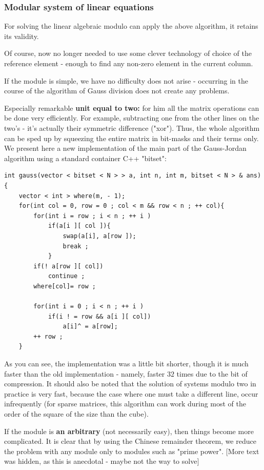 \subsubsection{ Modular system of linear equations }

For solving the linear algebraic modulo can apply the above algorithm, it retains its validity.

Of course, now no longer needed to use some clever technology of choice of the reference element - enough to find any non-zero element in the current column.

If the module is simple, we have no difficulty does not arise - occurring in the course of the algorithm of Gauss division does not create any problems.

Especially remarkable \textbf{unit equal to two:} for him all the matrix operations can be done very efficiently. For example, subtracting one from the other lines on the two's - it's actually their symmetric difference ("xor"). Thus, the whole algorithm can be sped up by squeezing the entire matrix in bit-masks and their terms only. We present here a new implementation of the main part of the Gauss-Jordan algorithm using a standard container C++ "bitset":

\begin{verbatim}
int gauss(vector < bitset < N > > a, int n, int m, bitset < N > & ans){
    vector < int > where(m, - 1);
    for(int col = 0, row = 0 ; col < m && row < n ; ++ col){
        for(int i = row ; i < n ; ++ i )
            if(a[i ][ col ]){
                swap(a[i], a[row ]);
                break ;
            }
        if(! a[row ][ col])
            continue ;
        where[col]= row ;
 
        for(int i = 0 ; i < n ; ++ i )
            if(i ! = row && a[i ][ col])
                a[i]^ = a[row];
        ++ row ;
    } 
\end{verbatim}
As you can see, the implementation was a little bit shorter, though it is much faster than the old implementation - namely, faster $32$ times due to the bit of compression. It should also be noted that the solution of systems modulo two in practice is very fast, because the case where one must take a different line, occur infrequently (for sparse matrices, this algorithm can work during most of the order of the square of the size than the cube).

If the module is \textbf{an arbitrary} (not necessarily easy), then things become more complicated. It is clear that by using the Chinese remainder theorem, we reduce the problem with any module only to modules such as "prime power". [More text was hidden, as this is anecdotal - maybe not the way to solve]

